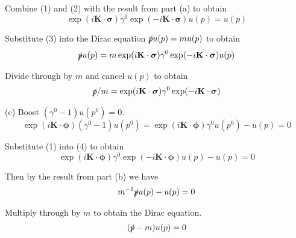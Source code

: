 Combine (1) and (2) with the result from part (a) to obtain
\begin{equation*}
\exp(i\mathbf K\cdot\boldsymbol\sigma)\gamma^0\exp(-i\mathbf K\cdot\boldsymbol\sigma)u(p)=u(p)
\tag{3}
\end{equation*}

Substitute (3) into the Dirac equation $\slashed pu(p)=mu(p)$ to obtain
\begin{equation*}
\slashed pu(p)=m\exp(i\mathbf K\cdot\boldsymbol\sigma)\gamma^0\exp(-i\mathbf K\cdot\boldsymbol\sigma)u(p)
\end{equation*}

Divide through by $m$ and cancel $u(p)$ to obtain
\begin{equation*}
\slashed p/m=\exp(i\mathbf K\cdot\boldsymbol\sigma)\gamma^0\exp(-i\mathbf K\cdot\boldsymbol\sigma)
\end{equation*}

(c) Boost $(\gamma^0-1)u(p^0)=0$.
\begin{equation*}
\exp(i\mathbf K\cdot\boldsymbol\phi)(\gamma^0-1)u(p^0)
=\exp(i\mathbf K\cdot\boldsymbol\phi)\gamma^0u(p^0)-u(p)=0
\tag{4}
\end{equation*}

Substitute (1) into (4) to obtain
\begin{equation*}
\exp(i\mathbf K\cdot\boldsymbol\phi)\gamma^0\exp(-i\mathbf K\cdot\boldsymbol\phi)u(p)-u(p)=0
\end{equation*}

Then by the result from part (b) we have
\begin{equation*}
m^{-1}\slashed pu(p)-u(p)=0
\end{equation*}

Multiply through by $m$ to obtain the Dirac equation.
\begin{equation*}
(\slashed p-m)u(p)=0
\end{equation*}


